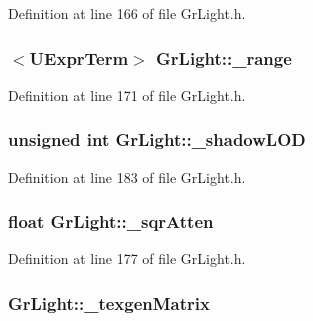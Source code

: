 Definition at line 166 of file GrLight.h.\hypertarget{class_gr_light_e658483426095681c1fa182817964df8}{
\subsubsection[{\_\-range}]{$<${\bf UExprTerm}$>$ {\bf GrLight::\_\-range}}}
\label{class_gr_light_e658483426095681c1fa182817964df8}




Definition at line 171 of file GrLight.h.\hypertarget{class_gr_light_7d00fdeecaa254a552fbea55e82ea644}{
\subsubsection[{\_\-shadowLOD}]{\setlength{\rightskip}{0pt plus 5cm}unsigned int {\bf GrLight::\_\-shadowLOD}}}
\label{class_gr_light_7d00fdeecaa254a552fbea55e82ea644}




Definition at line 183 of file GrLight.h.\hypertarget{class_gr_light_efd74a6030d308c8ddbb6d1694b83da2}{
\subsubsection[{\_\-sqrAtten}]{\setlength{\rightskip}{0pt plus 5cm}float {\bf GrLight::\_\-sqrAtten}}}
\label{class_gr_light_efd74a6030d308c8ddbb6d1694b83da2}




Definition at line 177 of file GrLight.h.\hypertarget{class_gr_light_ba5ad710e4cff79152083a6919d607bb}{
\subsubsection[{\_\-texgenMatrix}]{ {\bf GrLight::\_\-texgenMatrix}}}
\label{class_gr_light_ba5ad710e4cff79152083a6919d607bb}




